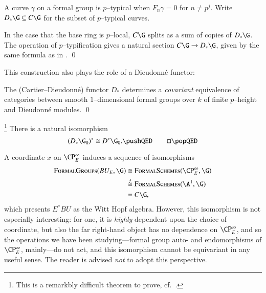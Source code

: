 \begin{definition}
A curve $\gamma$ on a formal group is $p$--typical when $F_n \gamma = 0$ for $n \ne p^j$.  Write $D_*\G \subseteq C\G$ for the subset of $p$--typical curves.
\end{definition}

\begin{lemma}
In the case that the base ring is $p$--local, $C\G$ splits as a sum of copies of $D_* \G$.  The operation of $p$--typification gives a natural section $C\G \to D_* \G$, given by the same formula as in . \qed
\end{lemma}

This construction also plays the role of a Dieudonn\'e functor:

\begin{theorem}\label{CurveDieudonneTheorem}
The (Cartier--Dieudonn\'e) functor $D_*$ determines a \emph{covariant} equivalence of categories between smooth $1$--dimensional formal groups over $k$ of finite $p$--height and Dieudonn\'e modules. \qed
\end{theorem}

\begin{theorem}\label{DieudonneDualityThm}\footnote{This is a remarkbly difficult theorem to prove, cf.\ .}
There is a natural isomorphism \[(D_* \G_0)^* \cong D^* \G_0. \pushQED\qed\qedhere\popQED\]
\end{theorem}

\begin{remark}
A coordinate $x$ on $\CP^\infty_E$ induces a sequence of isomorphisms
\begin{align*}
\CatOf{FormalGroups}(BU_E, \G) & \cong \CatOf{FormalSchemes}(\CP^\infty_E, \G) \\
& \stackrel{x}{\cong} \CatOf{FormalSchemes}(\A^1, \G) \\
& = C\G,
\end{align*}
which presents $E^* BU$ as the Witt Hopf algebra.  However, this isomorphism is not especially interesting: for one, it is \emph{highly} dependent upon the choice of coordinate, but also the far right-hand object has no dependence on $\CP^\infty_E$, and so the operations we have been studying---formal group auto- and endomorphisms of $\CP^\infty_E$, mainly---do not act, and this isomorphism cannot be equivariant in any useful sense.  The reader is advised \emph{not} to adopt this perspective.
\end{remark}

